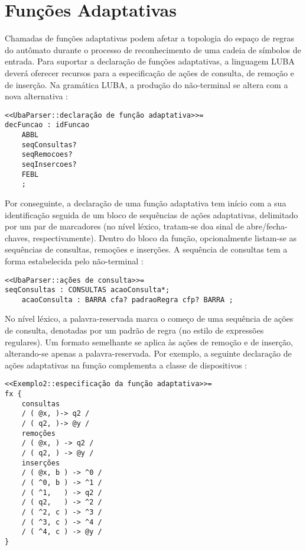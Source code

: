 \section{Funções Adaptativas}
\label{sec:isv:chamada-funcao-adaptativa}

Chamadas de funções adaptativas podem afetar a topologia do espaço de regras do autômato durante o processo de reconhecimento de uma cadeia de símbolos de entrada. Para suportar a declaração de funções adaptativas, a linguagem LUBA deverá oferecer recursos para a especificação de ações de consulta, de remoção e de inserção. Na gramática LUBA, a produção do não-terminal  se altera com a nova alternativa :

\begin{lstlisting}[style=antlr]
<<UbaParser::declaração de função adaptativa>>=
decFuncao : idFuncao
	ABBL
	seqConsultas?
	seqRemocoes?
	seqInsercoes?
	FEBL
	;
\end{lstlisting}

\noindent
Por conseguinte, a declaração de uma função adaptativa tem início com a sua identificação seguida de um bloco de sequências de ações adaptativas, delimitado por um par de marcadores (no nível léxico, tratam-se doa sinal de abre/fecha-chaves, respectivamente). Dentro do bloco da função, opcionalmente listam-se as sequências de consultas, remoções e inserções. A sequência de consultas tem a forma estabelecida pelo não-terminal :

\begin{lstlisting}[style=antlr]
<<UbaParser::ações de consulta>>=
seqConsultas : CONSULTAS acaoConsulta*;
    acaoConsulta : BARRA cfa? padraoRegra cfp? BARRA ;
\end{lstlisting}

No nível léxico, a palavra-reservada  marca o começo de uma sequência de ações de consulta, denotadas por um padrão de regra (no estilo de expressões regulares). Um formato semelhante se aplica às ações de remoção e de inserção, alterando-se apenas a palavra-reservada. Por exemplo, a seguinte declaração de ações adaptativas na função  complementa a classe de dispositivos :

\begin{lstlisting}
<<Exemplo2::especificação da função adaptativa>>=
fx {
    consultas
    / ( @x, )-> q2 /
    / ( q2, )-> @y /
    remoções
    / ( @x, ) -> q2 /
    / ( q2, ) -> @y /
    inserções
    / ( @x, b ) -> ^0 /
    / ( ^0, b ) -> ^1 /
    / ( ^1,   ) -> q2 /
    / ( q2,   ) -> ^2 /
    / ( ^2, c ) -> ^3 /
    / ( ^3, c ) -> ^4 /
    / ( ^4, c ) -> @y /
}
\end{lstlisting}

